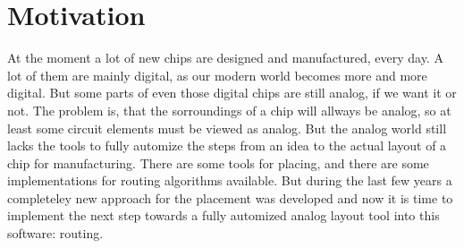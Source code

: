 \chapter{Motivation}
At the moment a lot of new chips are designed and manufactured, every day. A lot of them are mainly digital, as our modern world becomes more and more digital. But some parts of even those digital chips are still analog, if we want it or not. The problem is, that the sorroundings of a chip will allways be analog, so at least some circuit elements must be viewed as analog. But the analog world still lacks the tools to fully automize the steps from an idea to the actual layout of a chip for manufacturing. There are some tools for placing, and there are some implementations for routing algorithms available. But during the last few years a completeley new approach for the placement was developed and now it is time to implement the next step towards a fully automized analog layout tool into this software: routing.